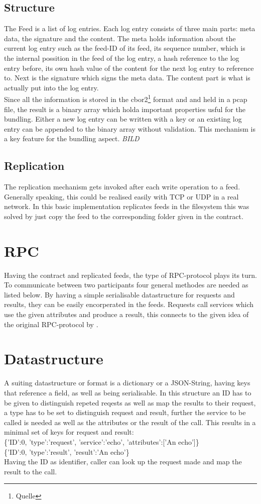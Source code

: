 \subsection{Structure}
The Feed is a list of log entries. Each log entry consists of three main parts: meta data, the signature and the content. The meta holds information about the current log entry such as the feed-ID of its feed, its sequence number, which is the internal possition in the feed of the log entry, a hash reference to the log entry before, its own hash value of the content for the next log entry to reference to. Next is the signature which signs the meta data. The content part is what is actually put into the log entry.\\
Since all the information is stored in the cbor2\footnote{Quelle} format and and held in a pcap file, the result is a binary array which holda important properties usful for the bundling. Either a new log entry can be written with a key or an existing log entry can be appended to the binary array without validation. This mechanism is a key feature for the bundling aspect.
\textit{BILD}
\subsection{Replication}
The replication mechanism gets invoked after each write operation to a feed. Generally speaking, this could be realised easily with TCP or UDP in a real network. In this basic implementation replicates feeds in the filesystem this was solved by just copy the feed to the corresponding folder given in the contract.
\section{RPC}
Having the contract and replicated feeds, the type of RPC-protocol plays its turn. To communicate between two participants four general methodes are needed as listed below. By having a simple serialisable datastructure for requests and results, they can be easily encorperated in the feeds. Requests call services which use the given attributes and produce a result, this connects to the given idea of the original RPC-protocol by \citet{birrell1984implementing}.
\section{Datastructure}
A suiting datastructure or format is a dictionary or a JSON-String, having keys that reference a field, as well as being serialisable. In this structure an ID has to be given to distinguish repeted reqests as well as map the results to their request, a type has to be set to distinguish request and result, further the service to be called is needed as well as the attributes or the result of the call. This results in a minimal set of keys for request and result:\\
\{'ID':0, 'type':'request', 'service':'echo', 'attributes':['An echo']\}\\
\{'ID':0, 'type':'result', 'result':'An echo'\}\\
Having the ID as identifier, caller can look up the request made and map the result to the call.
